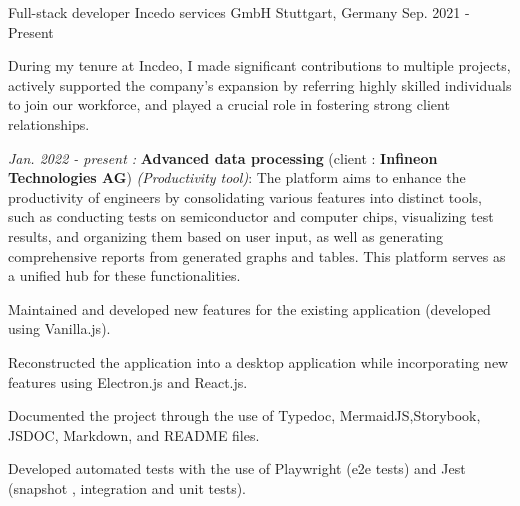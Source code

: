 

\begin{cventries}

  \cventry
    {Full-stack developer} %
    {Incedo services GmbH} %
    {Stuttgart, Germany} %
    {Sep. 2021 - Present} %
    {
      During my tenure at Incdeo, I made significant contributions to multiple projects, actively supported the company's
      expansion by referring highly skilled individuals to join our workforce, and played a crucial role in fostering strong
      client relationships.
      \vspace{5mm}
      \begin{cvitems} %
        \item {
          \textit{Jan. 2022 - present : }\textbf{Advanced data processing} (client : \textbf{Infineon Technologies AG}) \textit{(Productivity tool)}:
          \newline The platform aims to enhance the productivity of engineers by consolidating various features into distinct tools, such as conducting tests on semiconductor and computer chips, visualizing test results, and organizing them based on user input, as well as generating comprehensive reports from generated graphs and tables. This platform serves as a unified hub for these functionalities.
          \vspace{5mm}
        \begin{cvitems}
          \item {Maintained and developed new features for the existing application (developed using Vanilla.js).}
          \item {Reconstructed the application into a desktop application while incorporating new features using Electron.js and React.js.}
          \item {Documented the project through the use of Typedoc, MermaidJS,Storybook, JSDOC, Markdown, and README files.}
          \item {Developed automated tests with the use of Playwright (e2e tests) and Jest (snapshot , integration and unit tests).}

\end{cvitems}}
\end{cvitems}}
\end{cventries}
